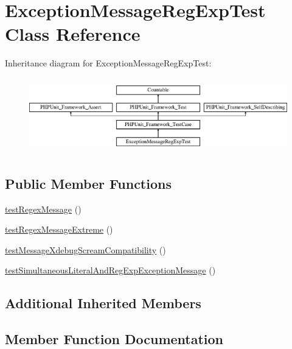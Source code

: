 \hypertarget{class_exception_message_reg_exp_test}{}\section{Exception\+Message\+Reg\+Exp\+Test Class Reference}
\label{class_exception_message_reg_exp_test}
Inheritance diagram for Exception\+Message\+Reg\+Exp\+Test\+:\begin{figure}[H]
\begin{center}
\leavevmode
\includegraphics[height=3.303835cm]{class_exception_message_reg_exp_test}
\end{center}
\end{figure}
\subsection*{Public Member Functions}
\begin{DoxyCompactItemize}
\item 
\mbox{\hyperlink{class_exception_message_reg_exp_test_a504ffa34c8776b18959289b25ff23cd0}{test\+Regex\+Message}} ()
\item 
\mbox{\hyperlink{class_exception_message_reg_exp_test_a12e0179297515159f2d171d1d9c7f9e8}{test\+Regex\+Message\+Extreme}} ()
\item 
\mbox{\hyperlink{class_exception_message_reg_exp_test_a5e6db2d9c36248b00821c51076591884}{test\+Message\+Xdebug\+Scream\+Compatibility}} ()
\item 
\mbox{\hyperlink{class_exception_message_reg_exp_test_acd8dfadfbb2a7970bf61fe6446d8991c}{test\+Simultaneous\+Literal\+And\+Reg\+Exp\+Exception\+Message}} ()
\end{DoxyCompactItemize}
\subsection*{Additional Inherited Members}


\subsection{Member Function Documentation}
\mbox{\label{class_exception_message_reg_exp_test_a5e6db2d9c36248b00821c51076591884}} 
